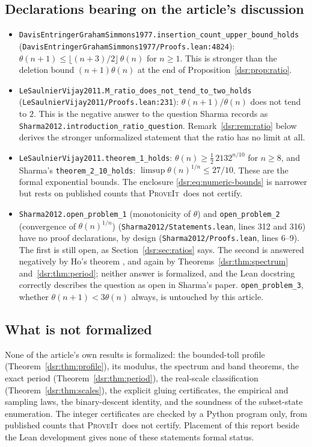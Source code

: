 \documentclass[11pt,a4paper]{article}
\numberwithin{equation}{section}
\theoremstyle{definition}
\theoremstyle{remark}
\newcommand{\repo}{\textsc{ProveIt}}
\newcommand{\lean}[1]{\nolinkurl{#1}}
\theoremstyle{definition}
\theoremstyle{plain}
\begin{document}
\subsection{Declarations bearing on the article's discussion}
\begin{itemize}[leftmargin=*,itemsep=3pt]\raggedright
\item \lean{DavisEntringerGrahamSimmons1977.insertion_count_upper_bound_holds}
 (\lean{DavisEntringerGrahamSimmons1977/Proofs.lean:4824}):
 $\theta(n+1)\le\lfloor(n+3)/2\rfloor\,\theta(n)$ for $n\ge1$. This is
 stronger than the deletion bound $(n+1)\theta(n)$ at the end of
 Proposition~\ref{dsr:prop:ratio}.
\item \lean{LeSaulnierVijay2011.M_ratio_does_not_tend_to_two_holds}
 (\lean{LeSaulnierVijay2011/Proofs.lean:231}): $\theta(n+1)/\theta(n)$ does
 not tend to $2$. This is the negative answer to the question Sharma records
 as \lean{Sharma2012.introduction_ratio_question}. Remark~\ref{dsr:rem:ratio}
 below derives the stronger unformalized statement that the ratio has no
 limit at all.
\item \lean{LeSaulnierVijay2011.theorem_1_holds}:
 $\theta(n)\ge\frac12\,2132^{n/10}$ for $n\ge8$, and Sharma's
 \lean{theorem_2_10_holds}: $\limsup\theta(n)^{1/n}\le27/10$. These are the
 formal exponential bounds. The enclosure \eqref{dsr:eq:numeric-bounds} is
 narrower but rests on published counts that \repo\ does not certify.
\item \lean{Sharma2012.open_problem_1} (monotonicity of $\theta$) and
 \lean{open_problem_2} (convergence of $\theta(n)^{1/n}$)
 (\lean{Sharma2012/Statements.lean}, lines 312 and 316) have no proof declarations, by
 design (\lean{Sharma2012/Proofs.lean}, lines 6--9). The first is still open,
 as Section~\ref{dsr:sec:ratios} says. The second is answered negatively by
 Ho's theorem \cite{Ho}, and again by
 Theorems~\ref{dsr:thm:spectrum} and~\ref{dsr:thm:period}; neither answer is
 formalized, and the Lean docstring correctly describes the question as open
 in Sharma's paper. \lean{open_problem_3}, whether
 $\theta(n+1)<3\theta(n)$ always, is untouched by this article.
\end{itemize}

\subsection{What is not formalized}
None of the article's own results is formalized: the bounded-toll profile
(Theorem~\ref{dsr:thm:profile}), its modulus, the spectrum and band
theorems, the exact period (Theorem~\ref{dsr:thm:period}), the real-scale
classification (Theorem~\ref{dsr:thm:scales}), the explicit gluing
certificates, the empirical and sampling laws, the binary-descent identity,
and the soundness of the subset-state enumeration. The integer certificates
are checked by a Python program only, from published counts that \repo\ does
not certify. Placement of this report beside the Lean development
gives none of these statements formal status.
\end{document}
